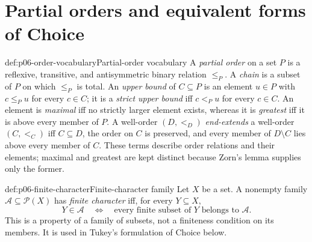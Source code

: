 \section[Partial orders and Choice]{Partial orders and equivalent forms of Choice}

\begin{hbdefinition}{def:p06-order-vocabulary}{Partial-order vocabulary}
A \emph{partial order} on a set \(P\) is a reflexive, transitive, and
antisymmetric binary relation \(\leq_P\).  A \emph{chain} is a subset of
\(P\) on which \(\leq_P\) is total.  An \emph{upper bound} of
\(C\subseteq P\) is an element \(u\in P\) with \(c\leq_Pu\) for every
\(c\in C\); it is a \emph{strict upper bound} iff \(c<_Pu\) for every
\(c\in C\).  An element is \emph{maximal} iff no strictly larger element
exists, whereas it is \emph{greatest} iff it is above every member of
\(P\).  A well-order \((D,<_{D})\) \emph{end-extends} a well-order
\((C,<_{C})\) iff \(C\subseteq D\), the order on \(C\) is preserved, and
every member of \(D\setminus C\) lies above every member of \(C\).
These terms describe order relations and their elements; maximal and greatest
are kept distinct because Zorn's lemma supplies only the former.
\end{hbdefinition}

\begin{hbdefinition}{def:p06-finite-character}{Finite-character family}
Let \(X\) be a set.  A nonempty family
\(\mathcal A\subseteq\mathcal P(X)\) has
\emph{finite character} iff, for every \(Y\subseteq X\),
\[
  Y\in\mathcal A
  \quad\Leftrightarrow\quad
  \text{every finite subset of \(Y\) belongs to \(\mathcal A\)}.
\]
This is a property of a family of subsets, not a finiteness condition on its
members.  It is used in Tukey's formulation of Choice below.
\end{hbdefinition}

